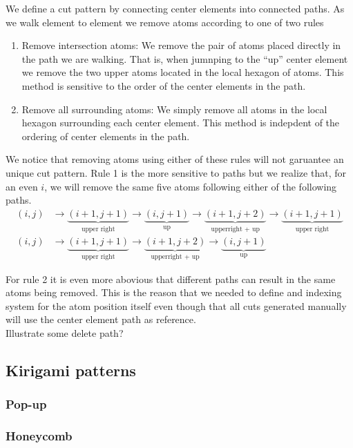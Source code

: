 We define a cut pattern by connecting center elements into connected paths. As
we walk element to element we remove atoms according to one of two rules 
\begin{enumerate}
  \item Remove intersection atoms: We remove the pair of atoms placed directly
  in the path we are walking. That is, when jumnping to the ``up'' center
  element we remove the two upper atoms located in the local hexagon of atoms.
  This method is sensitive to the order of the center elements in the path. 
  \item Remove all surrounding atoms: We simply remove all atoms in the local
  hexagon surrounding each center element. This method is indepdent of the
  ordering of center elements in the path.
\end{enumerate}

We notice that removing atoms using either of these rules will not garuantee an
unique cut pattern. Rule 1 is the more sensitive to paths but we realize that,
for an even $i$, we will remove the same five atoms following either of the
following paths.
\begin{align*}
  (i, j) &\rightarrow \underbrace{(i+1,j+1)}_{\text{upper right}} \rightarrow \underbrace{(i, j+1)}_{\text{up}} \rightarrow \underbrace{(i+1, j+2)}_{\text{upperright + up}} \rightarrow \underbrace{(i+1, j+1)}_{\text{upper right}} \\
  (i, j) &\rightarrow \underbrace{(i+1,j+1)}_{\text{upper right}} \rightarrow \underbrace{(i+1, j+2)}_{\text{upperright + up}} \rightarrow \underbrace{(i, j+1)}_{\text{up}}
\end{align*}

For rule 2 it is even more abovious that different paths can result in the same
atoms being removed. This is the reason that we needed to define and indexing
system for the atom position itself even though that all cuts generated manually
will use the center element path as reference. \\

Illustrate some delete path?



\subsection{Kirigami patterns}
\subsubsection{Pop-up}
\subsubsection{Honeycomb}
